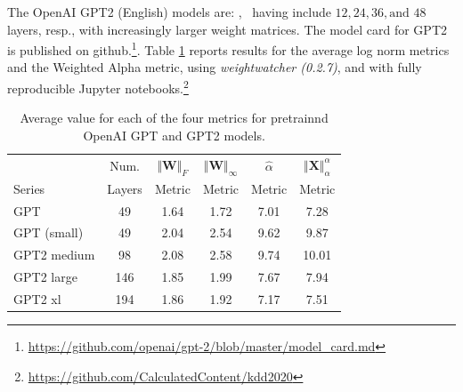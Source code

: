 The OpenAI GPT2 (English) models are: , \
having include $12, 24, 36, \text{and }48$ layers, resp., with increasingly larger weight matrices.
The model card for GPT2 is published on github.\footnote{\url{https://github.com/openai/gpt-2/blob/master/model_card.md}}.
Table \ref{table:nlp} reports results for the average log norm metrics and the Weighted Alpha metric, using \emph{weightwatcher (0.2.7)},
and with fully reproducible Jupyter notebooks.\footnote{\url{https://github.com/CalculatedContent/kdd2020}}
\michael{Fix that.}


\begin{table}[t]
\small
\begin{center}
\begin{tabular}{|p{0.75in}|c|c|c|c|c|}
\hline
        & Num.   & $\Vert\mathbf{W}\Vert_{F}$ & $\Vert\mathbf{W}\Vert_{\infty}$ & $\hat{\alpha}$ & $\Vert\mathbf{X}\Vert^{\alpha}_{\alpha}$ \\
 Series & Layers & Metric                     & Metric                          & Metric         & Metric                                   \\
\hline
GPT & 49 & 1.64  & 1.72 & 7.01 & 7.28 \\
GPT (small) & 49 & 2.04  & 2.54& 9.62 & 9.87 \\
GPT2 medium & 98 & 2.08 & 2.58& 9.74 & 10.01 \\
GPT2 large & 146 & 1.85 & 1.99& 7.67 & 7.94 \\
GPT2 xl & 194 & 1.86 & 1.92 & 7.17 & 7.51 \\
\hline
\end{tabular}
\end{center}
\caption{Average value for each of the four metrics for pretrainnd OpenAI GPT and GPT2 models.}
\label{table:nlp}
\end{table}


